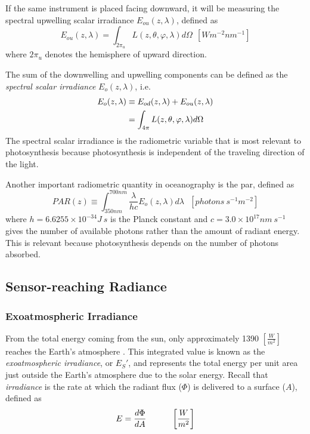 If the same instrument is placed facing downward, it will be measuring the spectral upwelling scalar irradiance $ E_{ou}(z,\lambda)$, defined as
\begin{equation}
  E_{ou}(z,\lambda)=\int_{2\pi_u} L(z,\theta,\varphi,\lambda)d\Omega~~\left[Wm^{-2}nm^{-1} \right]
\end{equation}
where $2\pi_u$ denotes the hemisphere of upward direction.

The sum of the downwelling and upwelling components can be defined as the {\it spectral scalar irradiance} $E_o(z,\lambda)$, i.e.
\begin{align}
  E_{o}(z,\lambda) &\equiv E_{od}(z,\lambda)+E_{ou}(z,\lambda)\notag \\
           &=\int_{4\pi} L(z,\theta,\varphi,\lambda)d\Omega
\end{align}
The spectral scalar irradiance is the radiometric variable that is most relevant to photosynthesis because photosynthesis is independent of the traveling direction of the light.

Another important radiometric quantity in oceanography is the \gls{par}, defined as
\begin{equation}
  PAR(z)\equiv \int_{350nm}^{700nm} \frac{\lambda}{hc}E_o(z,\lambda)d\lambda~~~\left[photons~s^{-1}m^{-2} \right]
\end{equation}
where $h=6.6255\times10^{-34}J~s$ is the Planck constant and $c=3.0\times10^{17}nm~s^{-1}$ gives the number of available photons rather than the amount of radiant energy. This is relevant because photosynthesis depends on the number of photons absorbed.

\subsection{Sensor-reaching Radiance}

\subsubsection{Exoatmospheric Irradiance}

From the total energy coming from the sun, only approximately 1390 $\left[\frac{W}{m^2}\right]$ reaches the Earth's atmosphere \citep{Schott}. This integrated value is known as the \emph{exoatmospheric irradiance}, or $E_S'$, and represents the total energy per unit area just outside the Earth's atmosphere due to the solar energy. Recall that \emph{irradiance} is the rate at which the radiant flux ($\Phi$) is delivered to a surface ($A$), defined as
\begin{equation} \label{eq:irradiance}
E = \frac{d\Phi}{dA}   \indent   \indent  \left[\frac{W}{m^2}\right]  
\end{equation} 

